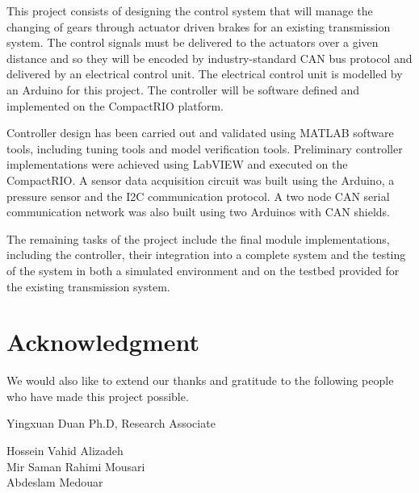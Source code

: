 \documentclass{article}
\begin{document}
\begin{flushleft}
	This project consists of designing the control system that will manage the changing of gears through actuator driven brakes for an existing transmission system. The control signals must be delivered to the actuators over a given distance and so they will be encoded by industry-standard CAN bus protocol and delivered by an electrical control unit. The electrical control unit is modelled by an Arduino for this project. The controller will be software defined and implemented on the CompactRIO platform.\end{flushleft}

\begin{flushleft}
	Controller design has been carried out and validated using MATLAB software tools, including tuning tools and model verification tools. Preliminary controller implementations were achieved using LabVIEW and executed on the CompactRIO. A sensor data acquisition circuit was built using the Arduino, a pressure sensor and the I2C communication protocol. A two node CAN serial communication network was also built using two Arduinos with CAN shields.\end{flushleft}

\begin{flushleft}
	The remaining tasks of the project include the final module implementations, including the controller, their integration into a complete system and the testing of the system in both a simulated environment and on the testbed provided for the existing transmission system.\end{flushleft}

\section{Acknowledgment}
	We would also like to extend our thanks and gratitude to the following people who have made this project possible.
\begin{flushleft}
	Yingxuan Duan Ph.D, Research Associate
\end{flushleft}

\begin{flushleft}
  Hossein Vahid Alizadeh\\
  Mir Saman Rahimi Mousari\\
  Abdeslam Medouar
\end{flushleft}

\newpage
\tableofcontents
\newpage
\end{document}

